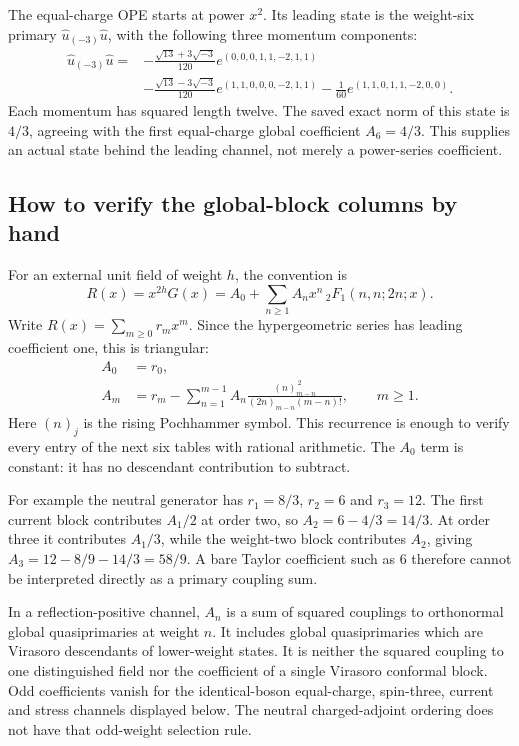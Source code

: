 The equal-charge OPE starts at power $x^2$. Its leading state is
the weight-six primary $\widehat u_{(-3)}\widehat u$, with the
following three momentum components:
\begin{align}
 \widehat u_{(-3)}\widehat u={}&
 -\frac{\sqrt{13}+3\sqrt{-3}}{120}
 e^{(0,0,0,1,1,-2,1,1)}\nonumber\\
 &-\frac{\sqrt{13}-3\sqrt{-3}}{120}
 e^{(1,1,0,0,0,-2,1,1)}
 -\frac1{60}e^{(1,1,0,1,1,-2,0,0)}.
 \label{expphysics:charged-leading-vector}
\end{align}
Each momentum has squared length twelve. The saved exact norm of
this state is $4/3$, agreeing with the first equal-charge global
coefficient $A_6=4/3$. This supplies an actual state behind the
leading channel, not merely a power-series coefficient.

\subsection{How to verify the global-block columns by hand}
\label{expphysics:block-recursion}

For an external unit field of weight $h$, the convention is
\begin{equation}
 R(x)=x^{2h}G(x)=A_0+\sum_{n\geq1}
 A_nx^n\,{}_2F_1(n,n;2n;x).
 \label{expphysics:global-convention}
\end{equation}
Write $R(x)=\sum_{m\geq0}r_mx^m$. Since the hypergeometric
series has leading coefficient one, this is triangular:
\begin{align}
 A_0&=r_0,\\
 A_m&=r_m-\sum_{n=1}^{m-1}A_n
 \frac{(n)_{m-n}^{\,2}}{(2n)_{m-n}(m-n)!},\qquad m\geq1.
 \label{expphysics:block-triangular}
\end{align}
Here $(n)_j$ is the rising Pochhammer symbol. This recurrence is
enough to verify every entry of the next six tables with rational
arithmetic. The $A_0$ term is constant: it has no descendant
contribution to subtract.

For example the neutral generator has $r_1=8/3$, $r_2=6$ and
$r_3=12$. The first current block contributes $A_1/2$ at order
two, so $A_2=6-4/3=14/3$. At order three it contributes $A_1/3$,
while the weight-two block contributes $A_2$, giving
$A_3=12-8/9-14/3=58/9$. A bare Taylor coefficient such as 6
therefore cannot be interpreted directly as a primary coupling sum.

In a reflection-positive channel, $A_n$ is a sum of squared
couplings to orthonormal global quasiprimaries at weight $n$.
It includes global quasiprimaries which are Virasoro descendants
of lower-weight states. It is neither the squared coupling to
one distinguished field nor the coefficient of a single
Virasoro conformal block. Odd coefficients vanish for the
identical-boson equal-charge, spin-three, current and stress
channels displayed below. The neutral charged-adjoint ordering
does not have that odd-weight selection rule.

